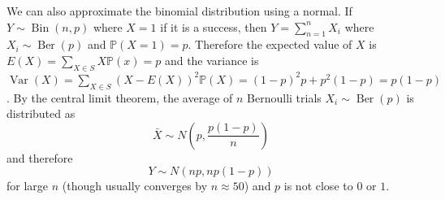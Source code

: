 \documentclass{article}
\newcommand{\p}{\mathbb{P}}
\begin{document}
We can also approximate the binomial distribution using a normal. If $Y\sim \operatorname{Bin}(n,p)$ where $X=1$ if it is a success, then $Y = \displaystyle{\sum^n_{n=1}X_i}$ where $X_i \sim \operatorname{Ber}(p)$ and $\p (X=1) =p$. Therefore the expected value of $X$ is $E(X) = \displaystyle{\sum_{X\in S}}X\p (x) = p$ and the variance is $\operatorname{Var}(X) = \displaystyle{\sum_{X\in S}}(X-E(X))^2\p (X) = (1-p)^2p + p^2(1-p) =p(1-p)$. By the central limit theorem, the average of $n$ Bernoulli trials $X_i \sim \operatorname{Ber}(p)$ is distributed as 
\begin{equation*}
    \bar X \sim N \left( p , \frac{p(1-p)}{n}\right)
\end{equation*}
and therefore
\begin{equation*}
    Y \sim N(np, np(1-p))
\end{equation*}
for large $n$ (though usually converges by $n\approx 50$) and $p$ is not close to $0$ or $1$.
\end{document}
